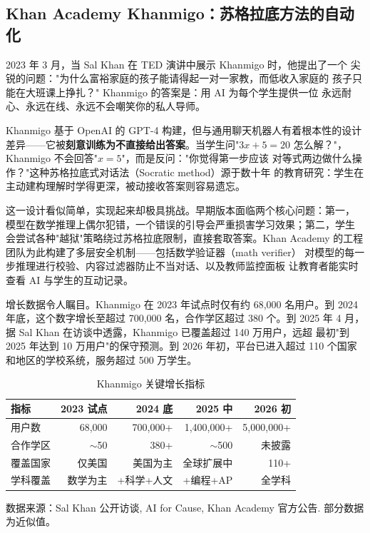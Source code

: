 \subsection{Khan Academy Khanmigo：苏格拉底方法的自动化}
\label{subsec:khanmigo}

2023 年 3 月，当 Sal Khan 在 TED 演讲中展示 Khanmigo 时，他提出了一个
尖锐的问题："为什么富裕家庭的孩子能请得起一对一家教，而低收入家庭的
孩子只能在大班课上挣扎？" Khanmigo 的答案是：用 AI 为每个学生提供一位
永远耐心、永远在线、永远不会嘲笑你的私人导师。

Khanmigo 基于 OpenAI 的 GPT-4 构建，但与通用聊天机器人有着根本性的设计
差异——它被\textbf{刻意训练为不直接给出答案}。当学生问"$3x + 5 = 20$
怎么解？"，Khanmigo 不会回答"$x = 5$"，而是反问："你觉得第一步应该
对等式两边做什么操作？"这种苏格拉底式对话法（Socratic method）源于数十年
的教育研究：学生在主动建构理解时学得更深，被动接收答案则容易遗忘。

这一设计看似简单，实现起来却极具挑战。早期版本面临两个核心问题：第一，
模型在数学推理上偶尔犯错，一个错误的引导会严重损害学习效果；第二，学生
会尝试各种"越狱"策略绕过苏格拉底限制，直接套取答案。Khan Academy
的工程团队为此构建了多层安全机制——包括数学验证器（math verifier）
对模型的每一步推理进行校验、内容过滤器防止不当对话、以及教师监控面板
让教育者能实时查看 AI 与学生的互动记录。

增长数据令人瞩目。Khanmigo 在 2023 年试点时仅有约 68,000 名用户。到
2024 年底，这个数字增长至超过 700,000 名，合作学区超过 380 个。到 2025
年 4 月，据 Sal Khan 在访谈中透露，Khanmigo 已覆盖超过 140 万用户，远超
最初"到 2025 年达到 10 万用户"的保守预测。到 2026 年初，平台已进入超过
110 个国家和地区的学校系统，服务超过 500 万学生。

\begin{table}[htbp]
\centering
\caption{Khanmigo 关键增长指标}
\label{tab:khanmigo-growth}
\small
\begin{tabularx}{\textwidth}{l r r r r}
\toprule
\rowcolor{figLightGray}
\textbf{指标} & \textbf{2023 试点} & \textbf{2024 底} & \textbf{2025 中} & \textbf{2026 初} \\
\midrule
用户数         & 68,000     & 700,000+   & 1,400,000+ & 5,000,000+ \\
合作学区       & $\sim$50   & 380+       & $\sim$500  & 未披露 \\
覆盖国家       & 仅美国     & 美国为主    & 全球扩展中 & 110+ \\
学科覆盖       & 数学为主   & +科学+人文 & +编程+AP   & 全学科 \\
\bottomrule
\end{tabularx}

\medskip
\noindent \small 数据来源：Sal Khan 公开访谈, AI for Cause, Khan Academy
官方公告. 部分数据为近似值。
\end{table}

